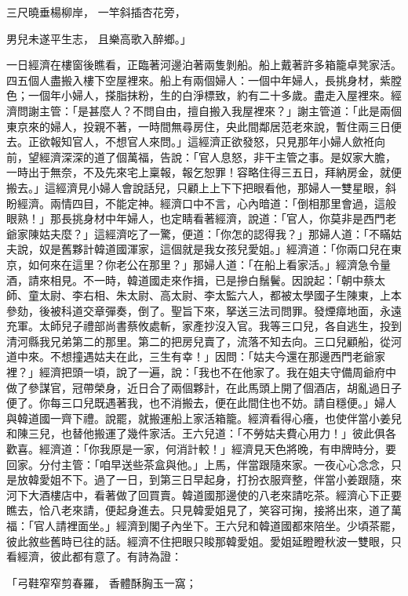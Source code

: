 三尺曉垂楊柳岸，  一竿斜插杏花旁，

男兒未遂平生志，  且樂高歌入醉鄉。」

一日經濟在樓窗後瞧看，正臨著河邊泊著兩隻剝船。船上戴著許多箱籠卓凳家活。四五個人盡搬入樓下空屋裡來。船上有兩個婦人：一個中年婦人，長挑身材，紫膛色；一個年小婦人，搽脂抹粉，生的白淨標致，約有二十多歲。盡走入屋裡來。經濟問謝主管：「是甚麼人？不問自由，擅自搬入我屋裡來？」謝主管道：「此是兩個東京來的婦人，投親不著，一時間無尋房住，央此間鄰居范老來說，暫住兩三日便去。正欲報知官人，不想官人來問。」這經濟正欲發怒，只見那年小婦人歛袵向前，望經濟深深的道了個萬福，告說：「官人息怒，非干主管之事。是奴家大膽，一時出于無奈，不及先來宅上稟報，報乞恕罪！容略住得三五日，拜納房金，就便搬去。」這經濟見小婦人會說話兒，只顧上上下下把眼看他，那婦人一雙星眼，斜盼經濟。兩情四目，不能定神。經濟口中不言，心內暗道：「倒相那里會過，這般眼熟！」那長挑身材中年婦人，也定睛看著經濟，說道：「官人，你莫非是西門老爺家陳姑夫麼？」這經濟吃了一驚，便道：「你怎的認得我？」那婦人道：「不瞞姑夫說，奴是舊夥計韓道國渾家，這個就是我女孩兒愛姐。」經濟道：「你兩口兒在東京，如何來在這里？你老公在那里？」那婦人道：「在船上看家活。」經濟急令量酒，請來相見。不一時，韓道國走來作揖，已是摻白鬚鬢。因說起：「朝中蔡太師、童太尉、李右相、朱太尉、高太尉、李太監六人，都被太學國子生陳東，上本參劾，後被科道交章彈奏，倒了。聖旨下來，拏送三法司問罪。發煙瘴地面，永遠充軍。太師兒子禮部尚書蔡攸處斬，家產抄沒入官。我等三口兒，各自逃生，投到清河縣我兄弟第二的那里。第二的把房兒賣了，流落不知去向。三口兒顧船，從河道中來。不想撞遇姑夫在此，三生有幸！」因問：「姑夫今還在那邊西門老爺家裡？」經濟把頭一頃，說了一遍，說：「我也不在他家了。我在姐夫守備周爺府中做了參謀官，冠帶榮身，近日合了兩個夥計，在此馬頭上開了個酒店，胡亂過日子便了。你每三口兒既遇著我，也不消搬去，便在此間住也不妨。請自穩便。」婦人與韓道國一齊下禮。說罷，就搬運船上家活箱籠。經濟看得心癢，也使伴當小姜兒和陳三兒，也替他搬運了幾件家活。王六兒道：「不勞姑夫費心用力！」彼此俱各歡喜。經濟道：「你我原是一家，何消計較！」經濟見天色將晚，有申牌時分，要回家。分付主管：「咱早送些茶盒與他。」上馬，伴當跟隨來家。一夜心心念念，只是放韓愛姐不下。過了一日，到第三日早起身，打扮衣服齊整，伴當小姜跟隨，來河下大酒樓店中，看著做了回買賣。韓道國那邊使的八老來請吃茶。經濟心下正要瞧去，恰八老來請，便起身進去。只見韓愛姐見了，笑容可掬，接將出來，道了萬福：「官人請裡面坐。」經濟到閣子內坐下。王六兒和韓道國都來陪坐。少頃茶罷，彼此敘些舊時已往的話。經濟不住把眼只睃那韓愛姐。愛姐延瞪瞪秋波一雙眼，只看經濟，彼此都有意了。有詩為證：

「弓鞋窄窄剪春羅，  香體酥胸玉一窩；

